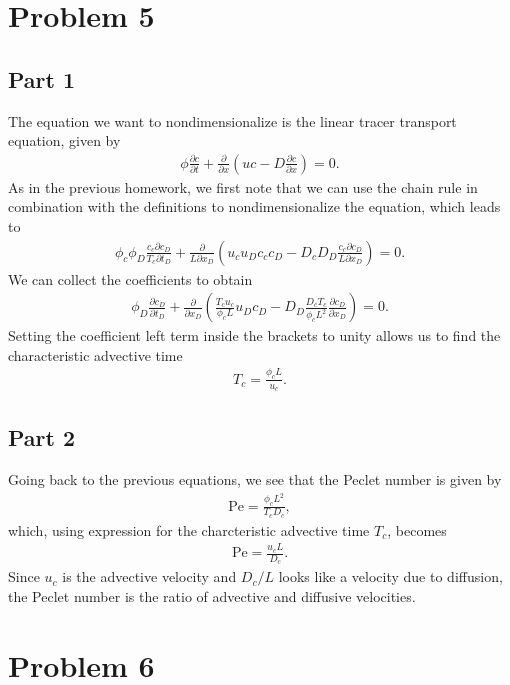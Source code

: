 \documentclass{article}
\begin{document}
\section{Problem 5}
\subsection{Part 1}
The equation we want to nondimensionalize is the linear tracer transport equation, given by
\begin{align}
    \phi \frac{\partial c}{\partial t} + \frac{\partial}{\partial x} \left(uc - D \frac{\partial c}{\partial x} \right) = 0.
\end{align}
As in the previous homework, we first note that we can use the chain rule in combination with the definitions to nondimensionalize the equation, which leads to
\begin{align}
    \phi_c \phi_D \frac{c_c \partial c_D}{T_c \partial t_D} + \frac{\partial}{L \partial x_D} \left(u_c u_D c_c c_D - D_c D_D \frac{c_c \partial c_D}{L \partial x_D} \right) = 0.
\end{align}
We can collect the coefficients to obtain
\begin{align}
    \phi_D \frac{\partial c_D}{\partial t_D} + \frac{\partial}{\partial x_D} \left(\frac{T_c u_c}{\phi_c L} u_D c_D - D_D \frac{D_c T_c}{\phi_c L^2} \frac{\partial c_D}{\partial x_D} \right) = 0.
\end{align}
Setting the coefficient left term inside the brackets to unity allows us to find the characteristic advective time
\begin{align}
    T_c = \frac{\phi_c L}{u_c}.
\end{align}

\subsection{Part 2}
Going back to the previous equations, we see that the Peclet number is given by
\begin{align}
    \mathrm{Pe} = \frac{\phi_c L^2}{T_c D_c},
\end{align}
which, using expression for the charcteristic advective time $T_c$, becomes
\begin{align}
    \mathrm{Pe} = \frac{u_c L}{D_c}.
\end{align}
Since $u_c$ is the advective velocity and $D_c / L$ looks like a velocity due to diffusion, the Peclet number is the ratio of advective and diffusive velocities.

\section{Problem 6}

% 
\end{document}
